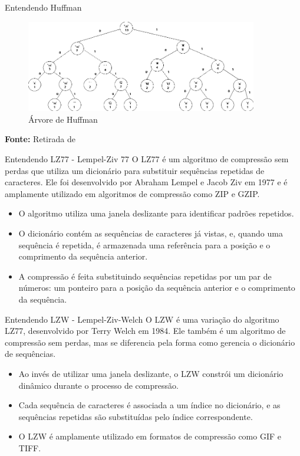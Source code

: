 \documentclass{beamer}
\begin{document}
    \begin{frame}{Entendendo Huffman}
        \begin{figure}
            \centering
            \caption{Árvore de Huffman} %
            \includegraphics[width=0.9\textwidth]{imagens/huffman_tree.png}
        \end{figure}
        \vspace{2mm} %
        \centering
        \textbf{Fonte:} Retirada de \textcolor{blue}{\cite{islene2007lab4}}%
    \end{frame}

    \begin{frame}{Entendendo LZ77 - Lempel-Ziv 77}
        O LZ77 é um algoritmo de compressão sem perdas que utiliza um dicionário para substituir sequências repetidas de caracteres. Ele foi desenvolvido por Abraham Lempel e Jacob Ziv em 1977 e é amplamente utilizado em algoritmos de compressão como ZIP e GZIP.
        \begin{itemize}
            \item O algoritmo utiliza uma janela deslizante para identificar padrões repetidos.
            \item O dicionário contém as sequências de caracteres já vistas, e, quando uma sequência é repetida, é armazenada uma referência para a posição e o comprimento da sequência anterior.
            \item A compressão é feita substituindo sequências repetidas por um par de números: um ponteiro para a posição da sequência anterior e o comprimento da sequência.
        \end{itemize}
    \end{frame}

    \begin{frame}{Entendendo LZW - Lempel-Ziv-Welch}
        O LZW é uma variação do algoritmo LZ77, desenvolvido por Terry Welch em 1984. Ele também é um algoritmo de compressão sem perdas, mas se diferencia pela forma como gerencia o dicionário de sequências.
        \begin{itemize}
            \item Ao invés de utilizar uma janela deslizante, o LZW constrói um dicionário dinâmico durante o processo de compressão.
            \item Cada sequência de caracteres é associada a um índice no dicionário, e as sequências repetidas são substituídas pelo índice correspondente.
            \item O LZW é amplamente utilizado em formatos de compressão como GIF e TIFF.
        \end{itemize}
    \end{frame}
\end{document}
